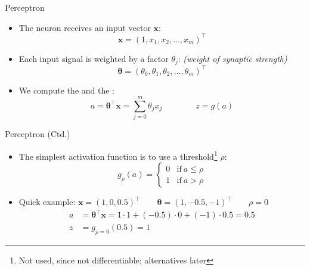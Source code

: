 \begin{frame}{Perceptron}{}
	\begin{itemize}
		\item The neuron receives an input vector $\bm{x}$:
		\begin{equation*}
			\bm{x} = (1, x_1, x_2, \dots, x_m)^{\intercal}
		\end{equation*}
		\item Each input signal is weighted by a factor $\theta_j$: {\footnotesize\textit{(weight of synaptic strength)}}
		\begin{equation*}
			\bm{\theta} = (\theta_0, \theta_1, \theta_2, \dots, \theta_m)^{\intercal}
		\end{equation*}
		\item We compute the  and the :
		\begin{equation}
			a = \bm{\theta}^{\intercal} \bm{x} = \sum_{j=0}^m \theta_j x_j \qquad\qquad
			z = g(a)
		\end{equation}
	\end{itemize}
\end{frame}


\begin{frame}{Perceptron (Ctd.)}{}
	\begin{itemize}
		\item The simplest activation function is to use a threshold\footnote[frame]{Not used, since not differentiable;
			alternatives later} $\rho$:
		\begin{equation*}
			g_{\rho}(a) =
			\begin{cases}
				0 & \text{if}\ a \le \rho \\
				1 & \text{if}\ a > \rho
			\end{cases}
		\end{equation*}
		\item Quick example: $\bm{x} = (1, 0, 0.5)^{\intercal} \qquad \bm{\theta} = (1, -0.5, -1)^{\intercal} \qquad \rho = 0$
		\begin{align*}
			a &= \bm{\theta}^{\intercal}\bm{x} = 1 \cdot 1 + (-0.5) \cdot 0 + (-1) \cdot 0.5 = 0.5 \\
			z &= g_{\rho=0}(0.5) = 1
		\end{align*}
	\end{itemize}
\end{frame}


